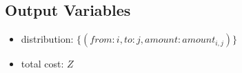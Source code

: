 \documentclass{article}
\begin{document}
\subsection*{Output Variables}
\begin{itemize}
    \item distribution: \( \{ (from: i, to: j, amount: amount_{i,j}) \} \)
    \item total cost: \( Z \)
\end{itemize}
\end{document}
